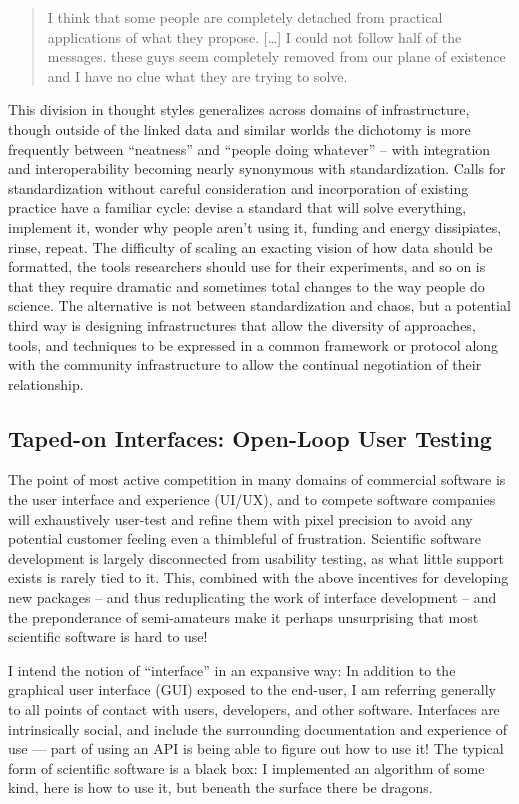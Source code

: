 \documentclass[10pt]{tufte-book}
\begin{document}
\begin{quote}
I think that some people are completely detached from practical
applications of what they propose. {[}\ldots{]} I could not follow half
of the messages. these guys seem completely removed from our plane of
existence and I have no clue what they are trying to solve.
\end{quote}

This division in thought styles generalizes across domains of
infrastructure, though outside of the linked data and similar worlds the
dichotomy is more frequently between ``neatness'' and ``people doing
whatever'' -- with integration and interoperability becoming nearly
synonymous with standardization. Calls for standardization without
careful consideration and incorporation of existing practice have a
familiar cycle: devise a standard that will solve everything, implement
it, wonder why people aren't using it, funding and energy dissipiates,
rinse, repeat. The difficulty of scaling an exacting vision of how data
should be formatted, the tools researchers should use for their
experiments, and so on is that they require dramatic and sometimes total
changes to the way people do science. The alternative is not between
standardization and chaos, but a potential third way is designing
infrastructures that allow the diversity of approaches, tools, and
techniques to be expressed in a common framework or protocol along with
the community infrastructure to allow the continual negotiation of their
relationship.


\subsection{Taped-on Interfaces: Open-Loop User
Testing}

The point of most active competition in many domains of commercial
software is the user interface and experience (UI/UX), and to compete
software companies will exhaustively user-test and refine them with
pixel precision to avoid any potential customer feeling even a
thimbleful of frustration. Scientific software development is largely
disconnected from usability testing, as what little support exists is
rarely tied to it. This, combined with the above incentives for
developing new packages -- and thus reduplicating the work of interface
development -- and the preponderance of semi-amateurs make it perhaps
unsurprising that most scientific software is hard to use!

I intend the notion of ``interface'' in an expansive way: In addition to
the graphical user interface (GUI) exposed to the end-user, I am
referring generally to all points of contact with users, developers, and
other software. Interfaces are intrinsically social, and include the
surrounding documentation and experience of use --- part of using an API
is being able to figure out how to use it! The typical form of
scientific software is a black box: I implemented an algorithm of some
kind, here is how to use it, but beneath the surface there be dragons.
\end{document}
